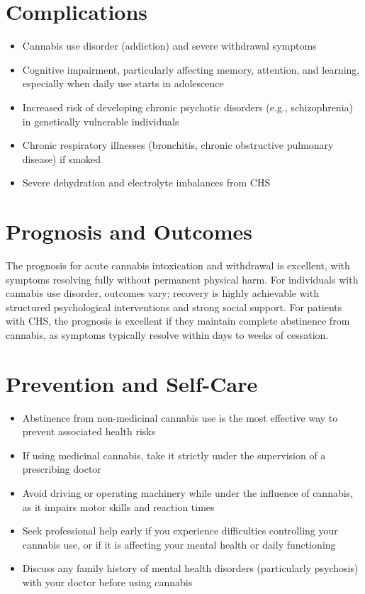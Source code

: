 \section*{Complications}
\begin{itemize}
    \item Cannabis use disorder (addiction) and severe withdrawal symptoms
    \item Cognitive impairment, particularly affecting memory, attention, and learning, especially when daily use starts in adolescence
    \item Increased risk of developing chronic psychotic disorders (e.g., schizophrenia) in genetically vulnerable individuals
    \item Chronic respiratory illnesses (bronchitis, chronic obstructive pulmonary disease) if smoked
    \item Severe dehydration and electrolyte imbalances from CHS
\end{itemize}

\section*{Prognosis and Outcomes}
The prognosis for acute cannabis intoxication and withdrawal is excellent, with symptoms resolving fully without permanent physical harm. For individuals with cannabis use disorder, outcomes vary; recovery is highly achievable with structured psychological interventions and strong social support. For patients with CHS, the prognosis is excellent if they maintain complete abstinence from cannabis, as symptoms typically resolve within days to weeks of cessation.

\section*{Prevention and Self-Care}
\begin{itemize}
    \item Abstinence from non-medicinal cannabis use is the most effective way to prevent associated health risks
    \item If using medicinal cannabis, take it strictly under the supervision of a prescribing doctor
    \item Avoid driving or operating machinery while under the influence of cannabis, as it impairs motor skills and reaction times
    \item Seek professional help early if you experience difficulties controlling your cannabis use, or if it is affecting your mental health or daily functioning
    \item Discuss any family history of mental health disorders (particularly psychosis) with your doctor before using cannabis
\end{itemize}

